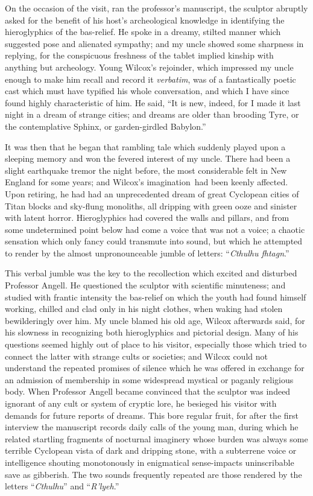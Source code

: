 On the occasion of the visit, ran the professor's manuscript, the
sculptor abruptly asked for the benefit of his host's archeological
knowledge in identifying the hieroglyphics of the bas-relief. He spoke
in a dreamy, stilted manner which suggested pose and alienated sympathy;
and my uncle showed some sharpness in replying, for the conspicuous
freshness of the tablet implied kinship with anything but archeology.
Young Wilcox's rejoinder, which impressed my uncle enough to make him
recall and record it \emph{verbatim}, was of a fantastically poetic cast which
must have typified his whole conversation, and which I have since found
highly characteristic of him. He said, ``It is new, indeed, for I made
it last night in a dream of strange cities; and dreams are older than
brooding Tyre, or the contemplative Sphinx, or garden-girdled Babylon.''

It was then that he began that rambling tale which suddenly played upon
a sleeping memory and won the fevered interest of my uncle. There had been a slight earthquake tremor the night before, the most considerable
felt in New England for some years; and Wilcox's imagination\est\ had been
keenly affected. Upon retiring, he had had an unprecedented dream of
great Cyclopean cities of Titan blocks and sky-flung monoliths, all
dripping with green ooze
and sinister with latent horror. Hieroglyphics
had covered the walls and pillars, and from some undetermined point
below had come a voice that was not a voice; a chaotic sensation which
only fancy could transmute into sound, but which he attempted to render
by the almost unpronounceable jumble of letters: ``\emph{Cthulhu fhtagn}.''

This verbal jumble was the key to the recollection which excited and
disturbed Professor Angell. He questioned the sculptor with scientific
minuteness; and studied with frantic intensity the bas-relief on which
the youth had found himself working, chilled and clad only in his night
clothes, when waking had stolen bewilderingly over him. My uncle blamed
his old age, Wilcox afterwards said, for his slowness in recognizing
both hieroglyphics and pictorial design. Many of his questions seemed
highly out of place to his visitor, especially those which tried to
connect the latter with strange cults or societies; and Wilcox could not
understand the repeated promises of silence which he was offered in
exchange for an admission of membership in some widespread mystical or
paganly religious body. When Professor Angell became convinced that the
sculptor was indeed ignorant of any cult or system of cryptic lore, he
besieged his visitor with demands for future reports of dreams. This
bore regular fruit, for after the first interview the manuscript records
daily calls of the young man, during which he related startling
fragments of nocturnal imaginery whose burden was always some terrible
Cyclopean vista of dark and dripping stone, with a subterrene voice or
intelligence shouting monotonously in enigmatical sense-impacts
uninscribable save as gibberish. The two sounds frequently repeated are
those rendered by the letters ``\emph{Cthulhu}'' and ``\emph{R'lyeh}.''

